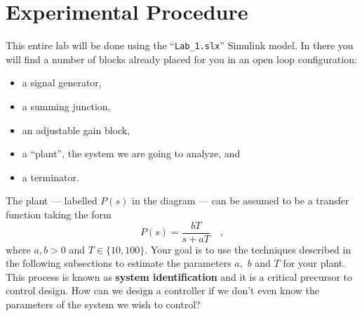 \section{Experimental Procedure}
This entire lab will be done using the ``\texttt{Lab\_1.slx}'' Simulink model.
In there you will
find a number of blocks already placed for you in an open loop configuration:
\begin{itemize}
  \item{a signal generator,}
  \item{a summing junction,}
  \item{an adjustable gain block,}
  \item{a ``plant'', the system we are going to analyze, and}
  \item{a terminator.}
\end{itemize}
%
The plant --- labelled \(P(s)\) in the diagram --- can be assumed to be a
transfer function taking the form
\[
  P(s) = \frac{b T}{s + a T} \quad ,
\]
where \(a, b > 0\) and \(T \in \{10, 100\}.\) Your goal is to use the
techniques described in the following subsections to estimate the parameters
\(a,\) \(b\) and \(T\) for your plant. This process is known as
\textbf{system identification} and it is a critical precursor to control
design. How can we design a controller if we don't even know the parameters
of the system we wish to control?


